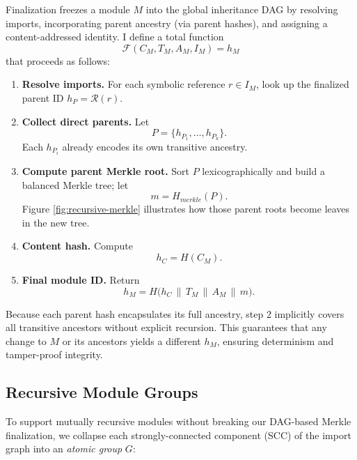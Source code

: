 \documentclass[sigplan,screen]{acmart}
\begin{document}
Finalization freezes a module $M$ into the global inheritance DAG by resolving imports, incorporating parent ancestry (via parent hashes), and assigning a content-addressed identity. I define a total function
\[
	\mathcal{F}(C_M, T_M, A_M, I_M) = h_M
\]
that proceeds as follows:

\begin{enumerate}
	\item \textbf{Resolve imports.} For each symbolic reference $r\in I_M$, look up the finalized parent ID $h_{P} = \mathcal{R}(r)$.
	\item \textbf{Collect direct parents.} Let 
		\[
			P = \{h_{P_1}, \dots, h_{P_k}\}.
		\]
	Each $h_{P_i}$ already encodes its own transitive ancestry.
	\item \textbf{Compute parent Merkle root.} Sort $P$ lexicographically and build a balanced Merkle tree; let
		\[
			m = H_{\mathit{merkle}}(P).
		\]
	Figure \ref{fig:recursive-merkle} illustrates how those parent roots become leaves in the new tree.
	\item \textbf{Content hash.} Compute
		\[
			h_C = H(C_M).
		\]
	\item \textbf{Final module ID.} Return
		\[
			h_M = H\bigl(h_C \,\|\, T_M \,\|\, A_M \,\|\, m\bigr).
		\]
\end{enumerate}

Because each parent hash encapsulates its full ancestry, step 2 implicitly covers all transitive ancestors without explicit recursion. This guarantees that any change to $M$ or its ancestors yields a different $h_M$, ensuring determinism and tamper-proof integrity.

\subsection{Recursive Module Groups}

To support mutually recursive modules without breaking our DAG-based Merkle finalization, we collapse each strongly-connected component (SCC) of the import graph into an \emph{atomic group} $G$:
\end{document}
